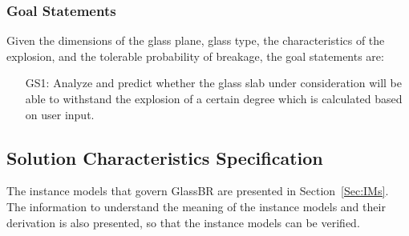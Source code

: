 \documentclass[12pt]{article}
\begin{document}
\subsubsection{Goal Statements}
\label{Sec:GoalStmt}
Given the dimensions of the glass plane, glass type, the characteristics of the explosion, and the tolerable probability of breakage, the goal statements are:
\begin{itemize}
\item[GS1:]Analyze and predict whether the glass slab under consideration will be able to withstand the explosion of a certain degree which is calculated based on user input.
\end{itemize}
\subsection{Solution Characteristics Specification}
\label{Sec:SolCharSpec}
The instance models that govern GlassBR are presented in Section~\ref{Sec:IMs}. The information to understand the meaning of the instance models and their derivation is also presented, so that the instance models can be verified.
\end{document}
